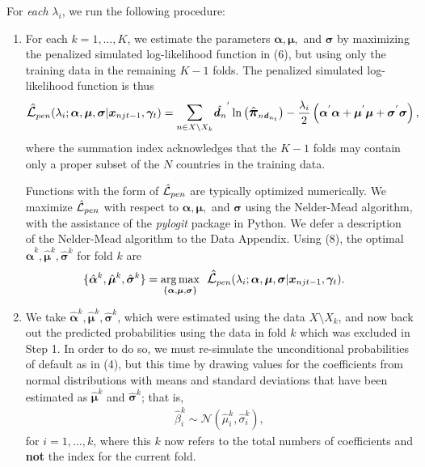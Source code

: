 \documentclass[12pt]{article}
\begin{document}
For \textit{each} $\lambda_i$, we run the following procedure:
\begin{enumerate}[listparindent=\parindent]
\item For each $k = 1, \dots, K$, we estimate the parameters $\boldsymbol{\alpha}, \boldsymbol{\mu},$ and $\boldsymbol{\sigma}$ by maximizing the penalized simulated log-likelihood function in (6), but using only the training data in the remaining $K-1$ folds. The penalized simulated log-likelihood function is thus
\begin{align}
\mathlarger{\hat{\mathcal{L}}}_{pen}(\lambda_i; \boldsymbol{\alpha}, \boldsymbol{\mu}, \boldsymbol{\sigma}|\boldsymbol{x}_{njt-1}, \boldsymbol{\gamma}_t) &= \mathlarger{\sum}\limits_{n \in X \setminus X_k} \hat{\boldsymbol{\mathit{d}}_n}^{'} \ln\left(\mathlarger{\hat{\boldsymbol{\pi}}}_{n\boldsymbol{\mathit{d}}_{n_{t}}}\right) - \frac{\lambda_i}{2}\left(\boldsymbol{\alpha}^{'}\boldsymbol{\alpha} + \boldsymbol{\mu}^{'}\boldsymbol{\mu} + \boldsymbol{\sigma}^{'}\boldsymbol{\sigma}\right),
\end{align}
where the summation index acknowledges that the $K-1$ folds may contain only a proper subset of the $N$ countries in the training data.

Functions with the form of $\mathlarger{\hat{\mathcal{L}}}_{pen}$ are typically optimized numerically. We maximize $\mathlarger{\hat{\mathcal{L}}}_{pen}$ with respect to $\boldsymbol{\alpha}, \boldsymbol{\mu},$ and $\boldsymbol{\sigma}$ using the Nelder-Mead algorithm, with the assistance of the \textit{pylogit} package in Python. We defer a description of the Nelder-Mead algorithm to the Data Appendix. Using (8), the optimal $\hat{\boldsymbol{\alpha}}^{k}, \hat{\boldsymbol{\mu}}^{k}, \hat{\boldsymbol{\sigma}}^{k}$ for fold $k$ are
\begin{align*}
\{\hat{\boldsymbol{\alpha}}^{k}, \hat{\boldsymbol{\mu}}^{k}, \hat{\boldsymbol{\sigma}}^{k}\} &= \underset{\{\boldsymbol{\alpha}, \boldsymbol{\mu}, \boldsymbol{\sigma}\}}{\arg \max} \ \ \mathlarger{\hat{\mathcal{L}}}_{pen}(\lambda_i; \boldsymbol{\alpha}, \boldsymbol{\mu}, \boldsymbol{\sigma}|\boldsymbol{x}_{njt-1}, \boldsymbol{\gamma}_t).
\end{align*}

\item We take $\hat{\boldsymbol{\alpha}}^{k}, \hat{\boldsymbol{\mu}}^{k}, \hat{\boldsymbol{\sigma}}^{k}$, which were estimated using the data $X \setminus X_k$, and now back out the predicted probabilities using the data in fold $k$ which was excluded in Step 1. In order to do so, we must re-simulate the unconditional probabilities of default as in (4), but this time by drawing values for the coefficients from normal distributions with means and standard deviations that have been estimated as $\hat{\boldsymbol{\mu}}^{k}$ and $\hat{\boldsymbol{\sigma}}^{k}$; that is,
\begin{align*}
\hat{\beta}_{i}^{k} \sim \mathcal{N}(\hat{\mu}_i^{k}, \hat{\sigma}_i^{k}),
\end{align*}
for $i = 1, \dots, k$, where this $k$ now refers to the total numbers of coefficients and \textbf{not} the index for the current fold.


\end{enumerate}
\end{document}
